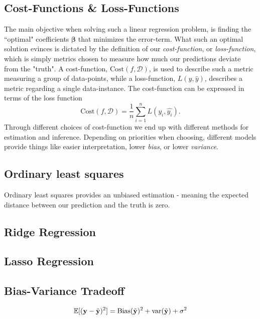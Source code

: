 \subsection{Cost-Functions \& Loss-Functions}
The main objective when solving such a linear regression problem, is finding the ``optimal" coefficients $\boldsymbol{\beta}$ that minimizes the error-term. 
What such an optimal solution evinces is dictated by the definition of our \textit{cost-function},  or \textit{loss-function}, which is simply metrics chosen to measure how much our predictions deviate from the "truth". 
A cost-function, $\text{Cost}(f,\mathcal{D} )$, is used to describe such a metric measuring a group of data-points, while a loss-function, $L(y, \hat{y})$, describes a metric regarding a single data-instance. 
The cost-function can be expressed in terms of the loss function
\begin{equation}
\text{Cost}(f,\mathcal{D}) = \frac{1}{n}\sum_{i=1}^n L(y_i, \hat{y_i}).
\end{equation}
Through different choices of cost-function we end up with different methods for estimation and inference. 
Depending on priorities when choosing, different models provide things like easier interpretation, lower \textit{bias}, or lower \textit{variance}.


\subsection{Ordinary least squares}
Ordinary least squares provides an unbiased estimation - meaning the expected distance between our prediction and the truth is zero. 

\subsection{Ridge Regression}

\subsection{Lasso Regression}

\subsection{Bias-Variance Tradeoff}


\begin{equation}\label{biasvar}
    \mathbb{E}[(\mathbf{y} - \Tilde{\mathbf{y}})^2] = \text{Bias}(\Tilde{\mathbf{y}})^2 + \text{var}(\Tilde{\mathbf{y}}) + \sigma^2
\end{equation}




